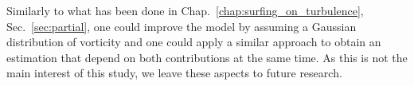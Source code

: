 Similarly to what has been done in Chap.~\ref{chap:surfing_on_turbulence}, Sec.~\ref{sec:partial}, one could improve the model by assuming a Gaussian distribution of vorticity and one could apply a similar approach to obtain an estimation that depend on both contributions at the same time.
As this is not the main interest of this study, we leave these aspects to future research.


% 
